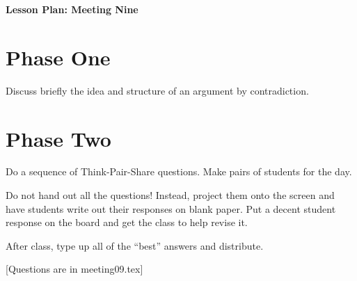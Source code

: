 \documentclass[12pt]{amsart}
\theoremstyle{definition}
\begin{document}
\begin{center}
\textbf{\Huge
Lesson Plan: Meeting Nine
}
\end{center}
\vspace{.5in}

\section{Phase One}
Discuss briefly the idea and structure of an argument by contradiction.

\section{Phase Two}
Do a sequence of Think-Pair-Share questions. 
Make pairs of students for the day.

Do not hand out all the questions!
Instead, project them onto the screen and have students write out their responses on blank paper. 
Put a decent student response on the board and get the class to help revise it.

After class, type up all of the ``best'' answers and distribute.

[Questions are in meeting09.tex]
\end{document}

